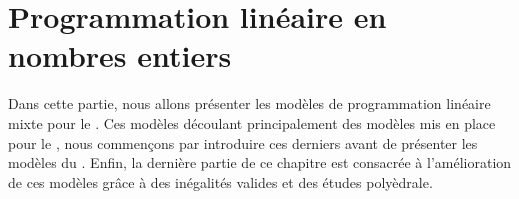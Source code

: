 

\newpage
\begin{minipage}{0.95\linewidth}
\part{Programmation linéaire en nombres entiers}
\vspace{15mm} %
\parttoc 
\end{minipage}




Dans cette partie, nous allons présenter les modèles de programmation
linéaire mixte pour le \CECSP. Ces modèles découlant principalement
des modèles mis en place pour le \RCPSP, nous commençons par
introduire ces derniers avant de présenter les modèles du
\CECSP. Enfin, la dernière partie de ce chapitre est consacrée à
l'amélioration de ces modèles grâce à des inégalités valides et des
études polyèdrale. 
